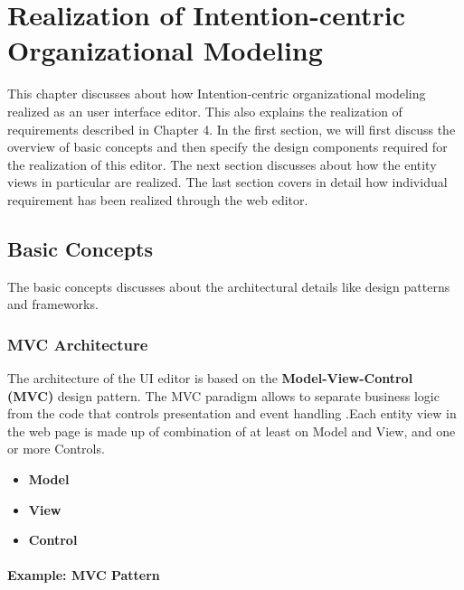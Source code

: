 \chapter{Realization of Intention-centric Organizational Modeling}
\label{chap:realization}
\hspace{4ex} This chapter discusses about how Intention-centric organizational modeling realized as an user interface editor. This also explains the realization of requirements described in Chapter 4. In the first section, we will first discuss the overview of basic concepts and then specify the design components required for the realization of this editor. The next section discusses about how the entity views in particular are realized. The last section covers in detail how individual requirement has been realized through the web editor.


\section{Basic Concepts}
\hspace{4ex} The basic concepts discusses about the architectural details like design patterns and frameworks.
\subsection{MVC Architecture}
\hspace{4ex} The architecture of the UI editor is based on the \textbf{Model-View-Control (MVC)} design pattern. The MVC paradigm allows to separate business logic from the code that controls presentation and event handling \cite{Oracle2016}.Each entity view in the web page is made up of combination of at least on Model and View, and one or more Controls.  

\begin{itemize}
\item \textbf{Model}
\item \textbf{View}
\item \textbf{Control}	
\end{itemize}
 
\subsubsection{Example: MVC Pattern}
